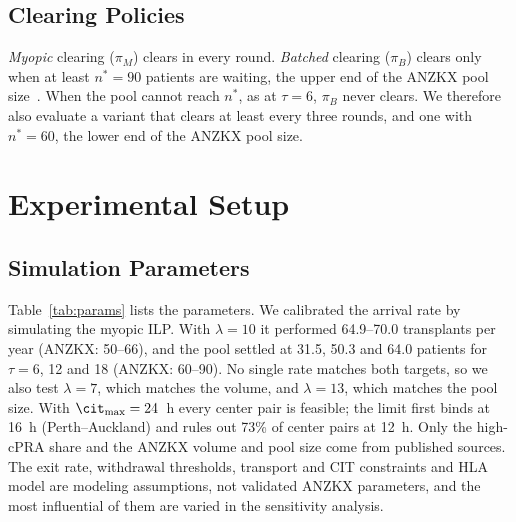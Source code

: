 \documentclass[journal]{IEEEtran}
\begin{document}
\subsection{Clearing Policies}
\label{sec:method:clearing}

\emph{Myopic} clearing ($\pi_M$) clears in every round. \emph{Batched}
clearing ($\pi_B$) clears only when at least $n^{*} = 90$ patients are
waiting, the upper end of the ANZKX pool size~\cite{ANZKX2021}. When the
pool cannot reach $n^{*}$, as at $\tau = 6$, $\pi_B$ never clears. We
therefore also evaluate a variant that clears at least every three
rounds, and one with $n^{*} = 60$, the lower end of the ANZKX pool size.

\section{Experimental Setup}
\label{sec:experiments}

\subsection{Simulation Parameters}
\label{sec:exp:pool}

Table~\ref{tab:params} lists the parameters. We calibrated the arrival
rate by simulating the myopic ILP. With $\lambda = 10$ it performed
64.9--70.0 transplants per year (ANZKX: 50--66), and the pool settled at
31.5, 50.3 and 64.0 patients for $\tau = 6$, 12 and 18 (ANZKX: 60--90).
No single rate matches both targets, so we also test $\lambda = 7$,
which matches the volume, and $\lambda = 13$, which matches the pool
size. With $\cit_{\max} = 24$~h every center pair is feasible; the limit
first binds at 16~h (Perth--Auckland) and rules out 73\% of center
pairs at 12~h. Only the high-cPRA share and the ANZKX volume and pool
size come from published sources. The exit rate, withdrawal thresholds,
transport and CIT constraints and HLA model are modeling assumptions,
not validated ANZKX parameters, and the most influential of them are
varied in the sensitivity analysis.
\end{document}
